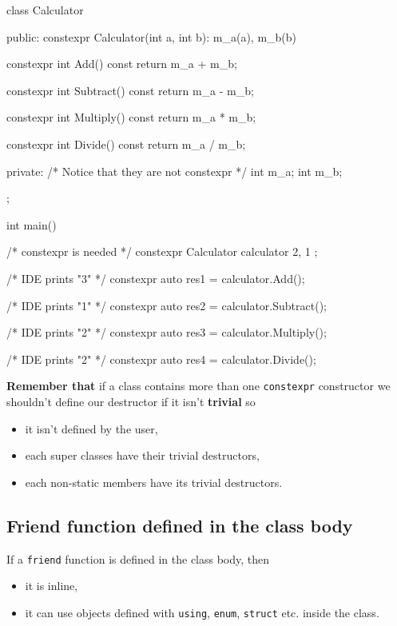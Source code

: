 \documentclass[../main]{subfiles}
\begin{document}
\begin{Code}
class Calculator
{
public:
    constexpr Calculator(int a, int b): m_a(a), m_b(b)
    {
    }
 
    constexpr int Add() const
    {
       return m_a + m_b;
    }
 
    constexpr int Subtract() const
    {
       return m_a - m_b;
    }
 
    constexpr int Multiply() const
    {
       return m_a * m_b;
    }
 
    constexpr int Divide() const
    {
       return m_a / m_b;
    }

private:
    /* Notice that they are not constexpr */
    int m_a;
    int m_b;
};

int main()
{
    /* constexpr is needed */
    constexpr Calculator calculator { 2, 1 };

    /* IDE prints "3" */
    constexpr auto res1 = calculator.Add();

    /* IDE prints "1" */
    constexpr auto res2 = calculator.Subtract();

    /* IDE prints "2" */
    constexpr auto res3 = calculator.Multiply();

    /* IDE prints "2" */
    constexpr auto res4 = calculator.Divide();
}    
\end{Code}

    \textbf{Remember that} if a class contains more than one \texttt{constexpr} constructor we shouldn't define our destructor if it isn't \textbf{trivial} so
\begin{itemize}
    \item it isn't defined by the user,
    \item each super classes have their trivial destructors,
    \item each non-static members have its trivial destructors.
\end{itemize}

\subsection{Friend function defined in the class body}
    If a \texttt{friend} function is defined in the class body, then
\begin{itemize}
    \item it is inline,
    \item it can use objects defined with \texttt{using}, \texttt{enum}, \texttt{struct} etc. inside the class.
\end{itemize}
\end{document}
